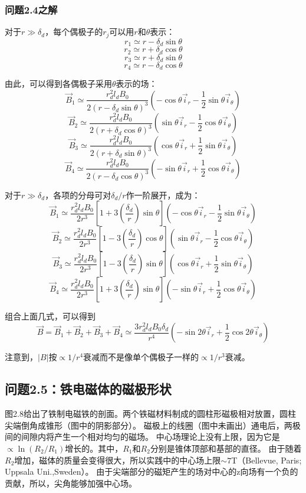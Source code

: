 \subsubsection*{问题2.4之解}
对于$r\gg \delta_d$，每个偶极子的$r_j$可以用$r$和$\theta$表示：
$$r_1\simeq r-\delta_d \sin\theta$$
$$r_2\simeq r+\delta_d \cos\theta$$
$$r_3\simeq r+\delta_d \sin\theta$$
$$r_4\simeq r-\delta_d \cos\theta$$

由此，可以得到各偶极子采用$\theta$表示的场：
$$ \vec{B}_1 \simeq \frac{r_d^2 l_d B_0}{2(r-\delta_d\sin\theta)^3}(-\cos\theta \vec{i}_r-\frac{1}{2}\sin\theta \vec{i}_\theta)$$
$$ \vec{B}_2 \simeq \frac{r_d^2 l_d B_0}{2(r+\delta_d\cos\theta)^3}(\sin\theta \vec{i}_r-\frac{1}{2}\cos\theta \vec{i}_\theta)$$
$$ \vec{B}_3 \simeq \frac{r_d^2 l_d B_0}{2(r+\delta_d\sin\theta)^3}(\cos\theta \vec{i}_r+\frac{1}{2}\sin\theta \vec{i}_\theta)$$
$$ \vec{B}_4 \simeq \frac{r_d^2 l_d B_0}{2(r-\delta_d\cos\theta)^3}(-\sin\theta \vec{i}_r+\frac{1}{2}\cos\theta \vec{i}_\theta)$$

对于$r\gg \delta_d$，各项的分母可对$\delta_d/r$作一阶展开，成为：
$$ \vec{B}_1 \simeq \frac{r_d^2 l_d B_0}{2 r^3}\left[1+3(\frac{\delta_d}{r})\sin\theta \right](-\cos\theta \vec{i}_r-\frac{1}{2}\sin\theta \vec{i}_\theta)$$
$$ \vec{B}_2 \simeq \frac{r_d^2 l_d B_0}{2 r^3}\left[1-3(\frac{\delta_d}{r})\cos\theta \right](\sin\theta \vec{i}_r-\frac{1}{2}\cos\theta \vec{i}_\theta)$$
$$ \vec{B}_3 \simeq \frac{r_d^2 l_d B_0}{2 r^3}\left[1-3(\frac{\delta_d}{r})\sin\theta \right](\cos\theta \vec{i}_r+\frac{1}{2}\sin\theta \vec{i}_\theta)$$
$$ \vec{B}_4 \simeq \frac{r_d^2 l_d B_0}{2 r^3}\left[1+3(\frac{\delta_d}{r})\sin\theta \right](-\sin\theta \vec{i}_r+\frac{1}{2}\cos\theta \vec{i}_\theta)$$

组合上面几式，可以得到
$$ \vec{B}=\vec{B}_1+\vec{B}_2+\vec{B}_3+\vec{B}_4\simeq \frac{3r_d^2 l_d B_0 \delta_d}{r^4}(-\sin 2\theta \vec{i}_r+\frac{1}{2}\cos 2\theta \vec{i}_\theta)$$

注意到，$|B|$按$\propto 1/r^4$衰减而不是像单个偶极子一样的$\propto 1/r^3$衰减。


\subsection{问题2.5：铁电磁体的磁极形状}
图2.8给出了铁制电磁铁的剖面。两个铁磁材料制成的圆柱形磁极相对放置，圆柱尖端倒角成锥形（图中的阴影部分）。
磁极上的线圈（图中未画出）通电后，两极间的间隙内将产生一个相对均匀的磁场。
中心场理论上没有上限，因为它是$\propto \ln(R_2/R_1)$增长的。其中，$R_1$和$R_2$分别是锥体顶部和基部的直径。
由于随着$R_2$增加，磁体的质量会变得很大，所以实践中的中心场上限$\sim 7$T（Bellevue, Paris; Uppsala Uni.,Sweden）。
由于尖端部分的磁矩产生的场对中心的z向场有一个负的贡献，所以，尖角能够加强中心场。

